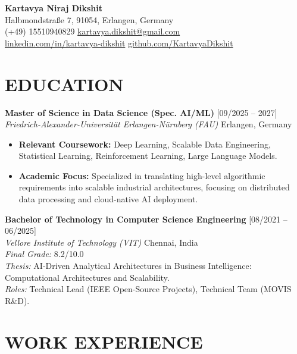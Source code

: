 \documentclass[10pt, a4paper]{article}
\begin{document}
\begin{center}
    {\Huge \bfseries \color{primarycolor} Kartavya Niraj Dikshit} \\
    \vspace{4pt}
    \small
    \faMapMarker* Halbmondstraße 7, 91054, Erlangen, Germany \\
    \faPhone* (+49) 15510940829 \quad \faEnvelope \href{mailto:kartavya.dikshit@gmail.com}{kartavya.dikshit@gmail.com} \\
    \faLinkedin \href{http://www.linkedin.com/in/kartavya-dikshit}{linkedin.com/in/kartavya-dikshit} \quad \faGithub \href{https://github.com/KartavyaDikshit}{github.com/KartavyaDikshit}
\end{center}

\section{EDUCATION}
\noindent
\textbf{Master of Science in Data Science (Spec. AI/ML)} \hfill [09/2025 -- 2027] \\
\textit{Friedrich-Alexander-Universität Erlangen-Nürnberg (FAU)} \hfill Erlangen, Germany
\begin{itemize}
    \item \textbf{Relevant Coursework:} Deep Learning, Scalable Data Engineering, Statistical Learning, Reinforcement Learning, Large Language Models.
    \item \textbf{Academic Focus:} Specialized in translating high-level algorithmic requirements into scalable industrial architectures, focusing on distributed data processing and cloud-native AI deployment.
\end{itemize}

\vspace{4pt}
\noindent
\textbf{Bachelor of Technology in Computer Science Engineering} \hfill [08/2021 -- 06/2025] \\
\textit{Vellore Institute of Technology (VIT)} \hfill Chennai, India \\
\textit{Final Grade:} 8.2/10.0 \\
\textit{Thesis:} AI-Driven Analytical Architectures in Business Intelligence: Computational Architectures and Scalability. \\
\textit{Roles:} Technical Lead (IEEE Open-Source Projects), Technical Team (MOVIS R\&D).

\section{WORK EXPERIENCE}
\end{document}
